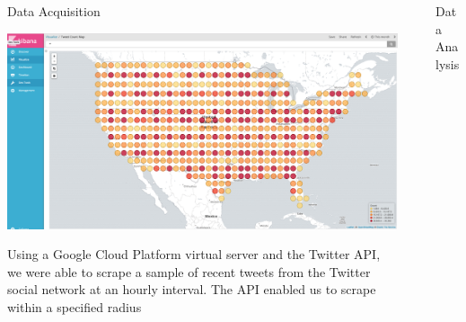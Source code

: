 \documentclass[final]{beamer}
\newlength{\sepwid}
\newlength{\onecolwid}
\newlength{\twocolwid}
\begin{document}
\begin{frame}[t]
\begin{columns}[t]
\begin{column}{\onecolwid}

\begin{block}{Data Acquisition}

\includegraphics[width=1\linewidth]{screenshot.png} 



Using a Google Cloud Platform virtual server and the Twitter API, we were able to scrape a sample of recent tweets from the Twitter social network at an hourly interval. The API enabled us to scrape within a specified radius
\end{block}


\end{column} %

\begin{column}{\sepwid}\end{column} %

\begin{column}{\twocolwid} %


\begin{block}{Data Analysis}
\end{block} 

\begin{columns}[t,totalwidth=\twocolwid] %


\end{columns}
\end{column}
\end{columns}
\end{frame}
\end{document}
